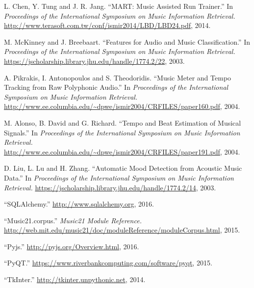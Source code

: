 \documentclass{article}
\begin{document}
\begin{thebibliography}{cites}
L. Chen, Y. Tung and J. R. Jang. ``MART: Music Assisted Run Trainer.'' In {\it Proceedings of the International Symposium on Music Information Retrieval.} \url{http://www.terasoft.com.tw/conf/ismir2014/LBD/LBD24.pdf}, 2014.

M. McKinney and J. Breebaart. ``Features for Audio and Music Classification.'' In {\it Proceedings of the International Symposium on Music Information Retrieval.} \url{https://jscholarship.library.jhu.edu/handle/1774.2/22}, 2003.

A. Pikrakis, I. Antonopoulos and S. Theodoridis. ``Music Meter and Tempo Tracking from Raw Polyphonic Audio.'' In {\it Proceedings of the International Symposium on Music Information Retrieval.} \url{http://www.ee.columbia.edu/~dpwe/ismir2004/CRFILES/paper160.pdf}, 2004.

M. Alonso, B. David and G. Richard. ``Tempo and Beat Estimation of Musical Signals.'' In {\it Proceedings of the International Symposium on Music Information Retrieval.} \url{http://www.ee.columbia.edu/~dpwe/ismir2004/CRFILES/paper191.pdf}, 2004.

D. Liu, L. Lu and H. Zhang. ``Automatic Mood Detection from Acoustic Music Data.'' In {\it Proceedings of the International Symposium on Music Information Retrieval.} \url{https://jscholarship.library.jhu.edu/handle/1774.2/14}, 2003.

``SQLAlchemy.'' \url{http://www.sqlalchemy.org}, 2016.

``Music21.corpus.'' {\it Music21 Module Reference.} \url{http://web.mit.edu/music21/doc/moduleReference/moduleCorpus.html}, 2015.

``Pyjs.'' \url{http://pyjs.org/Overview.html}, 2016.

``PyQT.'' \url{https://www.riverbankcomputing.com/software/pyqt}, 2015.

``TkInter.'' \url{http://tkinter.unpythonic.net}, 2014.

\end{thebibliography}
\end{document}
